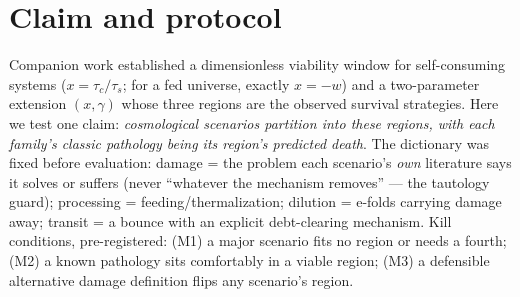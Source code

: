 \documentclass[11pt]{article}
\begin{document}
\section{Claim and protocol}
Companion work established a dimensionless viability window for self-consuming systems
($x = \tau_c/\tau_s$; for a fed universe, exactly $x = -w$) and a two-parameter extension
$(x, \gamma)$ whose three regions are the observed survival strategies. Here we test one claim:
\emph{cosmological scenarios partition into these regions, with each family's classic pathology
being its region's predicted death}. The dictionary was fixed before evaluation: damage = the
problem each scenario's \emph{own} literature says it solves or suffers (never ``whatever the
mechanism removes'' --- the tautology guard); processing = feeding/thermalization; dilution =
e-folds carrying damage away; transit = a bounce with an explicit debt-clearing mechanism.
Kill conditions, pre-registered: (M1) a major scenario fits no region or needs a fourth;
(M2) a known pathology sits comfortably in a viable region; (M3) a defensible alternative damage
definition flips any scenario's region.
\end{document}
